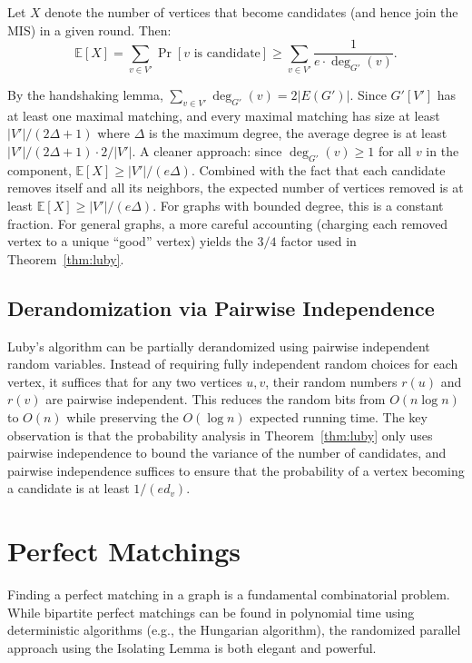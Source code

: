 \documentclass[twoside,12pt]{book}
\theoremstyle{plain}
\theoremstyle{definition}
\theoremstyle{remark}
\begin{document}
Let $X$ denote the number of vertices that become candidates (and hence join the MIS) in a given round. Then:
\[
\mathbb{E}[X] = \sum_{v \in V'} \Pr[v \text{ is candidate}] \geq \sum_{v \in V'} \frac{1}{e \cdot \deg_{G'}(v)}.
\]

By the handshaking lemma, $\sum_{v \in V'} \deg_{G'}(v) = 2|E(G')|$. Since $G'[V']$ has at least one maximal matching, and every maximal matching has size at least $|V'|/(2\Delta + 1)$ where $\Delta$ is the maximum degree, the average degree is at least $|V'|/(2\Delta+1) \cdot 2/|V'|$. A cleaner approach: since $\deg_{G'}(v) \geq 1$ for all $v$ in the component, $\mathbb{E}[X] \geq |V'|/(e\Delta)$. Combined with the fact that each candidate removes itself and all its neighbors, the expected number of vertices removed is at least $\mathbb{E}[X] \geq |V'|/(e\Delta)$. For graphs with bounded degree, this is a constant fraction. For general graphs, a more careful accounting (charging each removed vertex to a unique ``good'' vertex) yields the $3/4$ factor used in Theorem~\ref{thm:luby}.

\subsection{Derandomization via Pairwise Independence}
\label{subsec:derandomize-mis}

Luby's algorithm can be partially derandomized using pairwise independent random variables. Instead of requiring fully independent random choices for each vertex, it suffices that for any two vertices $u, v$, their random numbers $r(u)$ and $r(v)$ are pairwise independent. This reduces the random bits from $O(n \log n)$ to $O(n)$ while preserving the $O(\log n)$ expected running time. The key observation is that the probability analysis in Theorem~\ref{thm:luby} only uses pairwise independence to bound the variance of the number of candidates, and pairwise independence suffices to ensure that the probability of a vertex becoming a candidate is at least $1/(ed_v)$.

\section{Perfect Matchings}
\label{sec:perfect-matchings-bis}

Finding a perfect matching in a graph is a fundamental combinatorial problem. While bipartite perfect matchings can be found in polynomial time using deterministic algorithms (e.g., the Hungarian algorithm), the randomized parallel approach using the Isolating Lemma is both elegant and powerful.
\end{document}
